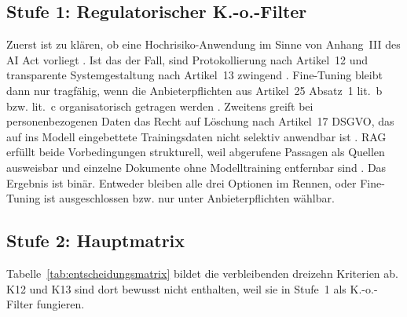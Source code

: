 \subsection{Stufe 1: Regulatorischer K.-o.-Filter}
\label{sec:ko-filter}

Zuerst ist zu klären, ob eine Hochrisiko-Anwendung im Sinne von Anhang~III des AI Act vorliegt \autocite[Art.~6]{EuropaischesParlamentundRat.2024}. Ist das der Fall, sind Protokollierung nach Artikel~12 und transparente Systemgestaltung nach Artikel~13 zwingend \autocite[Art.~12, Art.~13]{EuropaischesParlamentundRat.2024}. Fine-Tuning bleibt dann nur tragfähig, wenn die Anbieterpflichten aus Artikel~25 Absatz~1 lit.~b bzw. lit.~c organisatorisch getragen werden \autocite[Art.~25 Abs.~1]{EuropaischesParlamentundRat.2024}. Zweitens greift bei personenbezogenen Daten das Recht auf Löschung nach Artikel~17 DSGVO, das auf ins Modell eingebettete Trainingsdaten nicht selektiv anwendbar ist \autocite[Art.~17]{EuropaischesParlamentundRat.2016}. RAG erfüllt beide Vorbedingungen strukturell, weil abgerufene Passagen als Quellen ausweisbar und einzelne Dokumente ohne Modelltraining entfernbar sind \autocite[7]{Lewis.2020}. Das Ergebnis ist binär. Entweder bleiben alle drei Optionen im Rennen, oder Fine-Tuning ist ausgeschlossen bzw. nur unter Anbieterpflichten wählbar.

\subsection{Stufe 2: Hauptmatrix}
\label{sec:matrix}

Tabelle~\ref{tab:entscheidungsmatrix} bildet die verbleibenden dreizehn Kriterien ab. K12 und K13 sind dort bewusst nicht enthalten, weil sie in Stufe~1 als K.-o.-Filter fungieren.

